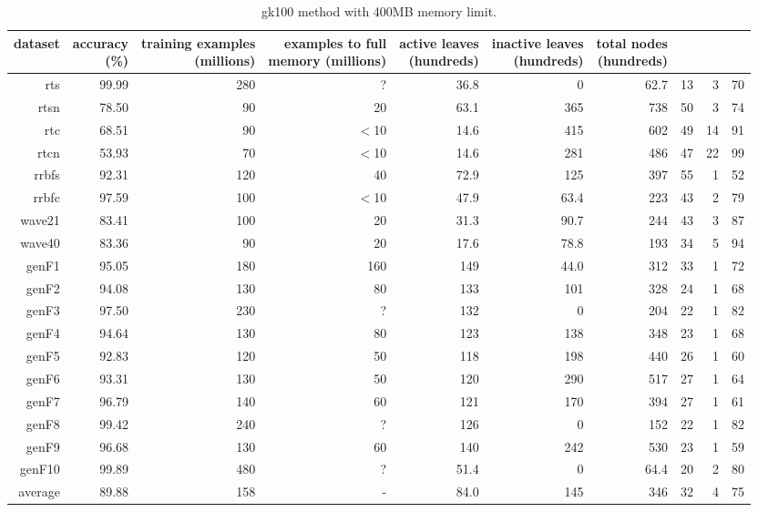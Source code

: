 \clearpage
\begin{table}
\caption{{\sc gk100} method with 400MB memory limit.}
\label{tab:gk100-400MB}
\centering
\begin{tabular}{|r|r|r|r|r|r|r|r|r|r|}
\hline
dataset	&
\rotatebox{90}{\parbox{9em}{accuracy\\(\%)}} &
\rotatebox{90}{\parbox{9em}{training examples\\(millions)}} &
\rotatebox{90}{\parbox{9em}{examples to full\\memory (millions)}} &
\rotatebox{90}{\parbox{9em}{active leaves\\(hundreds)}} &
\rotatebox{90}{\parbox{9em}{inactive leaves\\(hundreds)}} &
\rotatebox{90}{\parbox{9em}{total nodes\\(hundreds)}} &
\rotatebox{90}{\parbox{9em}{tree depth}}	&
\rotatebox{90}{\parbox{9em}{training speed (\%)}} &
\rotatebox{90}{\parbox{9em}{prediction speed (\%)}} \\
\hline
{\sc rts} & 99.99 & 280 & ? & 36.8 & 0 & 62.7 & 13 & 3 & 70 \\
{\sc rtsn} & 78.50 & 90 & 20 & 63.1 & 365 & 738 & 50 & 3 & 74 \\
{\sc rtc} & 68.51 & 90 & $<$10 & 14.6 & 415 & 602 & 49 & 14 & 91 \\
{\sc rtcn} & 53.93 & 70 & $<$10 & 14.6 & 281 & 486 & 47 & 22 & 99 \\
{\sc rrbfs} & 92.31 & 120 & 40 & 72.9 & 125 & 397 & 55 & 1 & 52 \\
{\sc rrbfc} & 97.59 & 100 & $<$10 & 47.9 & 63.4 & 223 & 43 & 2 & 79 \\
{\sc wave21} & 83.41 & 100 & 20 & 31.3 & 90.7 & 244 & 43 & 3 & 87 \\
{\sc wave40} & 83.36 & 90 & 20 & 17.6 & 78.8 & 193 & 34 & 5 & 94 \\
{\sc genF1} & 95.05 & 180 & 160 & 149 & 44.0 & 312 & 33 & 1 & 72 \\
{\sc genF2} & 94.08 & 130 & 80 & 133 & 101 & 328 & 24 & 1 & 68 \\
{\sc genF3} & 97.50 & 230 & ? & 132 & 0 & 204 & 22 & 1 & 82 \\
{\sc genF4} & 94.64 & 130 & 80 & 123 & 138 & 348 & 23 & 1 & 68 \\
{\sc genF5} & 92.83 & 120 & 50 & 118 & 198 & 440 & 26 & 1 & 60 \\
{\sc genF6} & 93.31 & 130 & 50 & 120 & 290 & 517 & 27 & 1 & 64 \\
{\sc genF7} & 96.79 & 140 & 60 & 121 & 170 & 394 & 27 & 1 & 61 \\
{\sc genF8} & 99.42 & 240 & ? & 126 & 0 & 152 & 22 & 1 & 82 \\
{\sc genF9} & 96.68 & 130 & 60 & 140 & 242 & 530 & 23 & 1 & 59 \\
{\sc genF10} & 99.89 & 480 & ? & 51.4 & 0 & 64.4 & 20 & 2 & 80 \\
\hline
average & 89.88 & 158 &  -  & 84.0 & 145 & 346 & 32 & 4 & 75 \\
\hline
\end{tabular}
\end{table}

